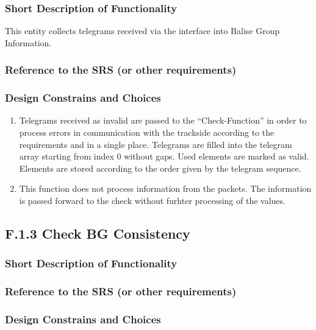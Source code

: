 \documentclass{template/openetcs_report}
\begin{document}
\subsubsection{Short Description of Functionality}
This entity collects telegrams received via the interface into Balise Group Information.
	
\subsubsection{Reference to the SRS (or other requirements)}
\subsubsection{Design Constrains and Choices}
\begin{enumerate}
\item Telegrams received as invalid are passed to the ``Check-Function'' in order to process errors in communication with the trackside according to the requirements and in a single place.
Telegrams are filled into the telegram array starting from index 0 without gaps. Used elements are marked as valid. Elements are stored according to the order given by the telegram sequence.
\item This function does not process information from the packets. The information is passed forward to the check without furhter processing of the values. 
\end{enumerate}



\subsection{F.1.3 Check BG Consistency}

\subsubsection{Short Description of Functionality}
\subsubsection{Reference to the SRS (or other requirements)}
\subsubsection{Design Constrains and Choices}
\end{document}
